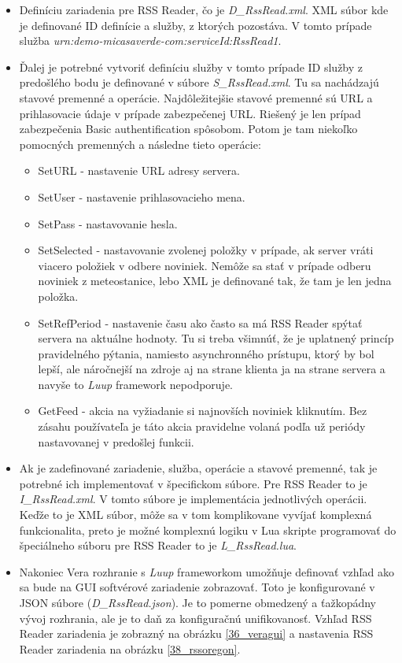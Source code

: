 \begin{itemize}
  \item Definíciu zariadenia pre RSS Reader, čo je \textit{D\_RssRead.xml}. XML súbor kde je definované ID definície a služby, z ktorých pozostáva. V tomto prípade služba \textit{urn:demo-micasaverde-com:serviceId:RssRead1}.
  \item Ďalej je potrebné vytvoriť definíciu služby v tomto prípade ID služby z predošlého bodu je definované v súbore \textit{S\_RssRead.xml}. Tu sa nachádzajú stavové premenné a operácie. Najdôležitejšie stavové premenné sú URL a prihlasovacie údaje v prípade zabezpečenej URL. Riešený je len prípad zabezpečenia Basic authentification spôsobom. Potom je tam niekoľko pomocných premenných a následne tieto operácie:
  \begin{itemize}
    \item SetURL - nastavenie URL adresy servera.
    \item SetUser - nastavenie prihlasovacieho mena.
    \item SetPass - nastavovanie hesla.
    \item SetSelected - nastavovanie zvolenej položky v prípade, ak server vráti viacero položiek v odbere noviniek. Nemôže sa stať v prípade odberu noviniek z meteostanice, lebo XML je definované tak, že tam je len jedna položka.
    \item SetRefPeriod - nastavenie času ako často sa má RSS Reader spýtať servera na aktuálne hodnoty. Tu si treba všimnúť, že je uplatnený princíp pravidelného pýtania, namiesto asynchronného prístupu, ktorý by bol lepší, ale náročnejší na zdroje aj na strane klienta ja na strane servera a navyše to \textit{Luup} framework nepodporuje.
    \item GetFeed - akcia na vyžiadanie si najnovších noviniek kliknutím. Bez zásahu používateľa je táto akcia pravidelne volaná podľa už periódy nastavovanej v predošlej funkcii.
  \end{itemize}  
  \item Ak je zadefinované zariadenie, služba, operácie a stavové premenné, tak je potrebné ich implementovať v špecifickom súbore. Pre RSS Reader to je \textit{I\_RssRead.xml}. V tomto súbore je implementácia jednotlivých operácii. Keďže to je XML súbor, môže sa v tom komplikovane vyvíjať komplexná funkcionalita, preto je možné komplexnú logiku v Lua skripte programovať do špeciálneho súboru pre RSS Reader to je \textit{L\_RssRead.lua}. 
  \item Nakoniec Vera rozhranie s \textit{Luup} frameworkom umožňuje definovať vzhľad ako sa bude na GUI softvérové zariadenie zobrazovať. Toto je konfigurované v JSON súbore (\textit{D\_RssRead.json}). Je to pomerne obmedzený a ťažkopádny vývoj rozhrania, ale je to daň za konfiguračnú unifikovanosť. Vzhľad RSS Reader zariadenia je zobrazný na obrázku  \ref{36_veragui} a nastavenia RSS Reader zariadenia na obrázku \ref{38_rssoregon}.  
\end{itemize}
